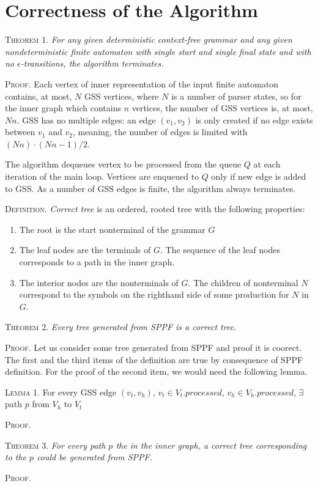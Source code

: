 \section{Correctness of the Algorithm}
\textsc{Theorem 1.}
\textit{For any given deterministic context-free grammar and any given nondeterministic
finite automaton with single start and single final state and with no $\epsilon$-transitions,
the algorithm terminates.}

\textsc{Proof.}
Each vertex of inner representation of the input finite automaton contains, at most, 
$N$ GSS vertices, where $N$ is a number of parser states, so for the inner graph which contains $n$
vertices, the number of GSS vertices is, at most, $Nn$. GSS has no multiple edges:
an edge $(v_{1}, v_{2})$ is only created if no edge exists between $v_{1}$ and $v_{2}$,  
meaning, the number of edges is limited with $(Nn) \cdot (Nn - 1) / 2 $. 

The algorithm dequeues vertex to be processed from the queue $Q$ at each iteration of the 
main loop. Vertices are enqueued to $Q$ only if new edge is added to GSS. As a number of 
GSS edges is finite, the algorithm always terminates. 



\textsc{Definition.} 
\emph{Correct tree} is an ordered, rooted tree with the following properties:
\begin{enumerate}
  \item The root is the start nonterminal of the grammar $G$
  \item The leaf nodes are the terminals of $G$. The sequence of the leaf nodes 
        corresponds to a path in the inner graph. 
  \item The interior nodes are the nonterminals of $G$. The children of nonterminal 
        $N$ correspond to the symbols on the righthand side of some production for $N$ in $G$.
\end{enumerate}

\textsc{Theorem 2.} 
\textit{Every tree generated from SPPF is a correct tree.}

\textsc{Proof.} Let us consider some tree generated from SPPF and proof it is coorect. 
The first and the third items of the definition are true by consequence of SPPF definition.
For the proof of the second item, we would need the following lemma. 

\textsc{Lemma 1.}
For every GSS edge $(v_{t}, v_{h})$, $v_{t} \in V_{t}.processed$, 
       $v_{h} \in V_{h}.processed$, $\exists$ path $p$ from $V_{h}$ to $V_{t}$

\textsc{Proof.}



\textsc{Theorem 3.} \textit{For every path $p$ the in the inner graph, a correct tree corresponding to 
                            the $p$ could be generated from SPPF.}

\textsc{Proof.}


